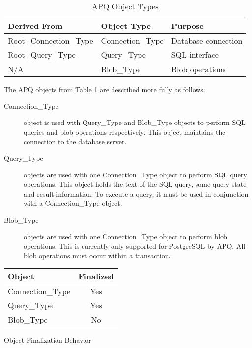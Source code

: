 \documentclass[english,letterpaper]{book}
\begin{document}
\begin{table}
   \begin{center}
   \begin{tabular}{lll}
   Derived From            &  Object Type       &  Purpose\\
   \hline
   Root\_Connection\_Type  &  Connection\_Type  & Database connection\\
   Root\_Query\_Type       &  Query\_Type       & SQL interface\\
   N/A                     &  Blob\_Type        & Blob operations\\
   \end{tabular}
   \end{center}
   \caption{APQ Object Types}\label{t:APQObj}
\end{table}

The APQ objects from Table \ref{t:APQObj} are described more fully as follows:

\begin{description}
   \item[Connection\_Type] object is used with Query\_Type and Blob\_Type objects
         to perform SQL queries and blob operations respectively. This object
         maintains the connection to the database server.
   \item[Query\_Type] objects are used with one Connection\_Type object
         to perform SQL query operations. This object holds the text of the
         SQL query, some query state and result information. To execute a 
         query, it must be used in conjunction with a Connection\_Type object.
   \item[Blob\_Type] objects are used with one Connection\_Type object to 
         perform blob operations. This is currently only supported for PostgreSQL
         by APQ. All blob operations must occur within a transaction.
\end{description}

\begin{floatingtable}{
      \begin{tabular}{lc}
      Object            & Finalized \\
      \hline 
      Connection\_Type  & Yes \\
      Query\_Type       & Yes \\
      Blob\_Type        & No \\
      \end{tabular}}
\caption{Object Finalization Behavior}\label{t:Finalization}
\end{floatingtable}
\end{document}
